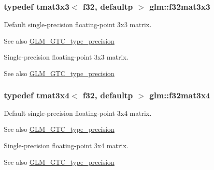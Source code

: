 \subsubsection[{f32mat3x3}]{\setlength{\rightskip}{0pt plus 5cm}typedef tmat3x3$<$ f32, defaultp $>$ {\bf glm\+::f32mat3x3}}\label{group__gtc__type__precision_ga715b36ea1e2d1ffaaef7517cc78b3877}
Default single-\/precision floating-\/point 3x3 matrix. \begin{DoxySeeAlso}{See also}
\hyperlink{group__gtc__type__precision}{G\+L\+M\+\_\+\+G\+T\+C\+\_\+type\+\_\+precision}
\end{DoxySeeAlso}
Single-\/precision floating-\/point 3x3 matrix. \begin{DoxySeeAlso}{See also}
\hyperlink{group__gtc__type__precision}{G\+L\+M\+\_\+\+G\+T\+C\+\_\+type\+\_\+precision} 
\end{DoxySeeAlso}
\hypertarget{group__gtc__type__precision_ga9995b357aa1e9603adad780cfde1aa07}{}
\subsubsection[{f32mat3x4}]{\setlength{\rightskip}{0pt plus 5cm}typedef tmat3x4$<$ f32, defaultp $>$ {\bf glm\+::f32mat3x4}}\label{group__gtc__type__precision_ga9995b357aa1e9603adad780cfde1aa07}
Default single-\/precision floating-\/point 3x4 matrix. \begin{DoxySeeAlso}{See also}
\hyperlink{group__gtc__type__precision}{G\+L\+M\+\_\+\+G\+T\+C\+\_\+type\+\_\+precision}
\end{DoxySeeAlso}
Single-\/precision floating-\/point 3x4 matrix. \begin{DoxySeeAlso}{See also}
\hyperlink{group__gtc__type__precision}{G\+L\+M\+\_\+\+G\+T\+C\+\_\+type\+\_\+precision} 
\end{DoxySeeAlso}
\hypertarget{group__gtc__type__precision_ga47bc5ddfbd368423c9b762c03ba7e77f}{}

